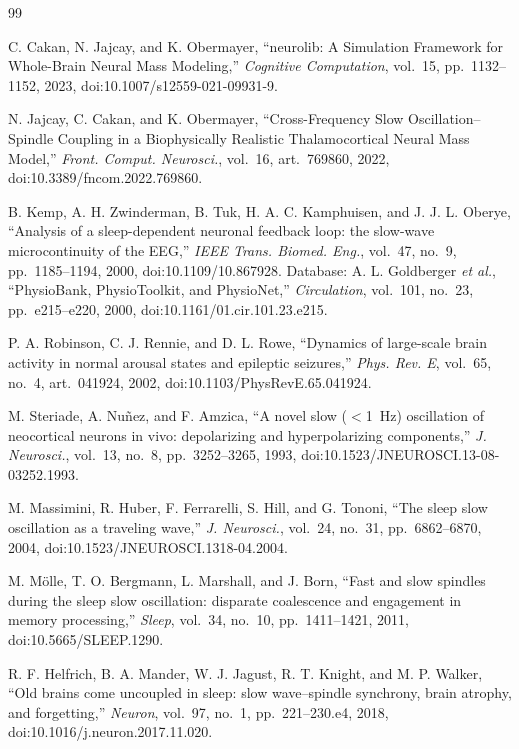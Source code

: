 \documentclass[conference]{IEEEtran}
\begin{document}
\begin{thebibliography}{99}

 C. Cakan, N. Jajcay, and K. Obermayer, ``neurolib: A
Simulation Framework for Whole-Brain Neural Mass Modeling,'' \emph{Cognitive
Computation}, vol.~15, pp.~1132--1152, 2023, doi:10.1007/s12559-021-09931-9.

 N. Jajcay, C. Cakan, and K. Obermayer, ``Cross-Frequency
Slow Oscillation--Spindle Coupling in a Biophysically Realistic Thalamocortical
Neural Mass Model,'' \emph{Front. Comput. Neurosci.}, vol.~16, art.~769860,
2022, doi:10.3389/fncom.2022.769860.

 B. Kemp, A. H. Zwinderman, B. Tuk, H. A. C. Kamphuisen, and
J. J. L. Oberye, ``Analysis of a sleep-dependent neuronal feedback loop: the
slow-wave microcontinuity of the EEG,'' \emph{IEEE Trans. Biomed. Eng.},
vol.~47, no.~9, pp.~1185--1194, 2000, doi:10.1109/10.867928. Database:
A. L. Goldberger \emph{et al.}, ``PhysioBank, PhysioToolkit, and PhysioNet,''
\emph{Circulation}, vol.~101, no.~23, pp.~e215--e220, 2000,
doi:10.1161/01.cir.101.23.e215.

 P. A. Robinson, C. J. Rennie, and D. L. Rowe, ``Dynamics
of large-scale brain activity in normal arousal states and epileptic
seizures,'' \emph{Phys. Rev. E}, vol.~65, no.~4, art.~041924, 2002,
doi:10.1103/PhysRevE.65.041924.

 M. Steriade, A. Nu\~nez, and F. Amzica, ``A novel slow
($<$1~Hz) oscillation of neocortical neurons in vivo: depolarizing and
hyperpolarizing components,'' \emph{J. Neurosci.}, vol.~13, no.~8,
pp.~3252--3265, 1993, doi:10.1523/JNEUROSCI.13-08-03252.1993.

 M. Massimini, R. Huber, F. Ferrarelli, S. Hill, and
G. Tononi, ``The sleep slow oscillation as a traveling wave,'' \emph{J.
Neurosci.}, vol.~24, no.~31, pp.~6862--6870, 2004,
doi:10.1523/JNEUROSCI.1318-04.2004.

 M. M\"olle, T. O. Bergmann, L. Marshall, and J. Born,
``Fast and slow spindles during the sleep slow oscillation: disparate
coalescence and engagement in memory processing,'' \emph{Sleep}, vol.~34,
no.~10, pp.~1411--1421, 2011, doi:10.5665/SLEEP.1290.

 R. F. Helfrich, B. A. Mander, W. J. Jagust, R. T.
Knight, and M. P. Walker, ``Old brains come uncoupled in sleep: slow
wave--spindle synchrony, brain atrophy, and forgetting,'' \emph{Neuron},
vol.~97, no.~1, pp.~221--230.e4, 2018, doi:10.1016/j.neuron.2017.11.020.


\end{thebibliography}
\end{document}

